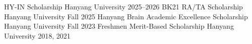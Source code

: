 
\begin{cvhonors}
  \cvhonor
    {HY-IN Scholarship}
    {Hanyang University}
    {}
    {2025--2026}
  \cvhonor
    {BK21 RA/TA Scholarship}
    {Hanyang University}
    {}
    {Fall 2025}
  \cvhonor
    {Hanyang Brain Academic Excellence Scholarship} %
    {Hanyang University} %
    {} %
    {Fall 2023} %
  \cvhonor
    {Freshmen Merit-Based Scholarship} %
    {Hanyang University} %
    {} %
    {2018, 2021} %

\end{cvhonors}
